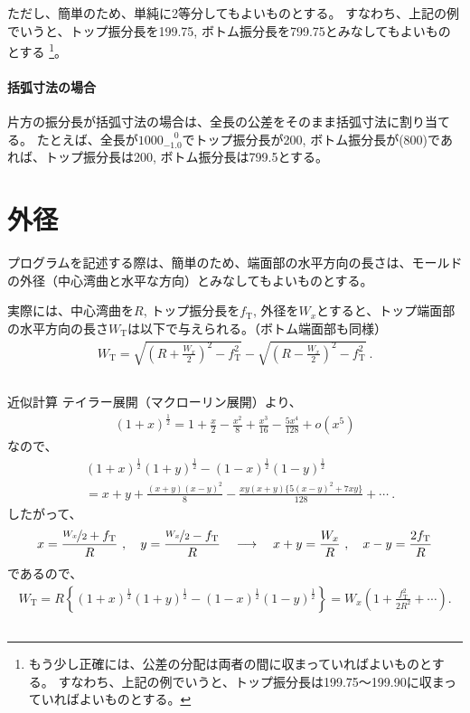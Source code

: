 ただし、簡単のため、単純に2等分してもよいものとする。
すなわち、上記の例でいうと、トップ振分長を199.75, ボトム振分長を799.75とみなしてもよいものとする
\footnote{もう少し正確には、公差の分配は両者の間に収まっていればよいものとする。
すなわち、上記の例でいうと、トップ振分長は199.75～199.90に収まっていればよいものとする。}。

\paragraph{括弧寸法の場合}\noindent
片方の振分長が括弧寸法の場合は、全長の公差をそのまま括弧寸法に割り当てる。
たとえば、全長が$1000^{\phantom +0}_{-1.0}$でトップ振分長が200, ボトム振分長が(800)であれば、トップ振分長は200, ボトム振分長は799.5とする。




\section{外径\label{app:gaikei}}
プログラムを記述する際は、簡単のため、端面部の水平方向の長さは、モールドの外径（中心湾曲と水平な方向）とみなしてもよいものとする。

実際には、中心湾曲を$R$, トップ振分長を$f_\mathrm T$, 外径を$W_x$とすると、トップ端面部の水平方向の長さ$W_\mathrm T$は以下で与えられる。（ボトム端面部も同様）
\begin{align*}
  W_\mathrm T
  = \sqrt{\left(R+\frac{W_x}2\right)^{\!2}-f_\mathrm T^2}
    -\sqrt{\left(R-\frac{W_x}2\right)^{\!2}-f_\mathrm T^2}\ .
\end{align*}
\begin{Column}{近似計算}
テイラー展開（マクローリン展開）より、
\begin{align*}
  (1+x)^\frac12 = 1+\frac x2-\frac{x^2}8+\frac{x^3}{16}-\frac{5x^4}{128}+o\!\left(x^5\right)
\end{align*}
なので、
\begin{align*}
  & (1+x)^\frac12(1+y)^\frac12-(1-x)^\frac12(1-y)^\frac12\\
  &= x+y+\frac{(x+y)(x-y)^2}8-\frac{xy(x+y)\big\{5(x-y)^2+7xy\big\}}{128}+\cdots\ .
\end{align*}
したがって、
\begin{align*}
  x = \frac{\nicefrac{W_x}2+f_\mathrm T}R\ ,\quad y = \frac{\nicefrac{W_x}2-f_\mathrm T}R\quad
  \longrightarrow \quad
  x+y = \frac{W_x}R\ , \quad x-y = \frac{2f_\mathrm T}R
\end{align*}
であるので、
\begin{align*}
  W_\mathrm T
  = R\left\{(1+x)^\frac12(1+y)^\frac12-(1-x)^\frac12(1-y)^\frac12\right\}
  = W_x\!\left(1+\frac{f_\mathrm T^2}{2R^2}+\cdots\right).
\end{align*}
\end{Column}




